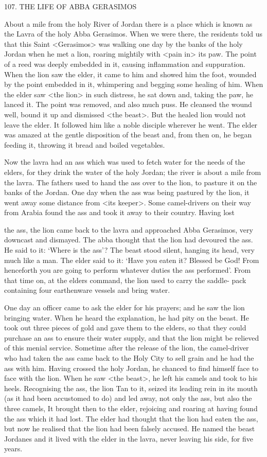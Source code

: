 107. THE LIFE OF ABBA GERASIMOS

About a mile from the holy River of Jordan there is a place which
is known as the Lavra of the holy Abba Gerasimos. When we were
there, the residents told us that this Saint <Gerasimos> was walking
one day by the banks of the holy Jordan when he met a lion,
roaring mightily with <pain in> its paw. The point of a reed was
deeply embedded in it, causing inflammation and suppuration.
When the lion saw the elder, it came to him and showed him the
foot, wounded by the point embedded in it, whimpering and
begging some healing of him. When the elder saw <the lion> in
such distress, he sat down and, taking the paw, he lanced it. The
point was removed, and also much puss. He cleansed the wound
well, bound it up and dismissed <the beast>. But the healed lion
would not leave the elder. It followed him like a noble disciple
wherever he went. The elder was amazed at the gentle disposition of
the beast and, from then on, he began feeding it, throwing it bread
and boiled vegetables.

Now the lavra had an ass which was used to fetch water for the
needs of the elders, for they drink the water of the holy Jordan; the
river is about a mile from the lavra. The fathers used to hand the
ass over to the lion, to pasture it on the banks of the Jordan. One
day when the ass was being pastured by the lion, it went away some
distance from <its keeper>. Some camel-drivers on their way from
Arabia found the ass and took it away to their country. Having lost

the ass, the lion came back to the lavra and approached Abba
Gerasimos, very downcast and dismayed. The abba thought that the
lion had devoured the ass. He said to it: `Where is the ass'? The
beast stood silent, hanging its head, very much like a man. The elder
said to it: `Have you eaten it? Blessed be God! From henceforth you
are going to perform whatever duties the ass performed'. From that
time on, at the elder\textquotesingle s command, the lion used to carry the saddle-
pack containing four earthenware vessels and bring water.

One day an officer came to ask the elder for his prayers; and he
saw the lion bringing water. When he heard the explanation, he had
pity on the beast. He took out three pieces of gold and gave them
to the elders, so that they could purchase an ass to ensure their
water supply, and that the lion might be relieved of this menial
service. Sometime after the release of the lion, the camel-driver who
had taken the ass came back to the Holy City to sell grain and he
had the ass with him. Having crossed the holy Jordan, he chanced
to find himself face to face with the lion. When he saw <the beast>,
he left his camels and took to his heels. Recognising the ass, the lion
Tan to it, seized its leading rein in its mouth (as it had been
accustomed to do) and led away, not only the ass, but also the three
camels, It brought then to the elder, rejoicing and roaring at having
found the ass which it had lost. The elder had thought that the lion
had eaten the ass, but now he realised that the lion had been falsely
accused. He named the beast Jordanes and it lived with the elder in
the lavra, never leaving his side, for five years.

